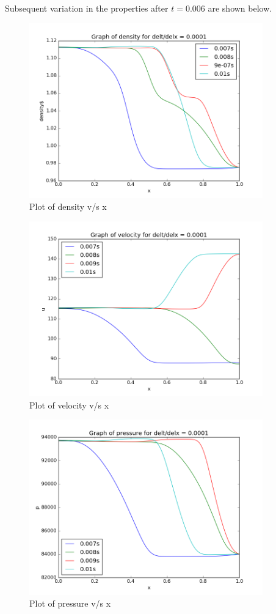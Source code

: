 \documentclass[11pt, a4paper]{article}
\begin{document}
Subsequent variation in the properties after $t=0.006$ are shown below.
\begin{figure}[H]
 \centering
 \includegraphics[width = 0.9\textwidth]{FTCS2_1_3.png}
 \caption{Plot of density v/s x}
\end{figure}
\begin{figure}[H]
 \centering
 \includegraphics[width = 0.9\textwidth]{FTCS2_1_6.png}
 \caption{Plot of velocity v/s x}
\end{figure}
\begin{figure}[H]
 \centering
 \includegraphics[width = 0.9\textwidth]{FTCS2_1_9.png}
 \caption{Plot of pressure v/s x}
\end{figure}
\end{document}
